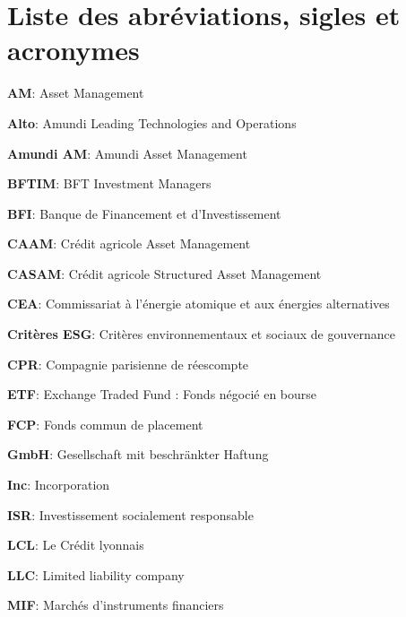 \chapter*{Liste des abréviations, sigles et acronymes}
\par \textbf{AM}: Asset Management \\
\par \textbf{Alto}: Amundi Leading Technologies and Operations \\
\par \textbf{Amundi AM}: Amundi Asset Management \\
\par \textbf{BFTIM}: BFT Investment Managers \\
\par \textbf{BFI}: Banque de Financement et d'Investissement \\
\par \textbf{CAAM}: Crédit agricole Asset Management \\
\par \textbf{CASAM}: Crédit agricole Structured Asset Management \\
\par \textbf{CEA}: Commissariat à l'énergie atomique et aux énergies alternatives\\
\par \textbf{Critères ESG}: Critères environnementaux et sociaux de gouvernance\\
\par \textbf{CPR}: Compagnie parisienne de réescompte \\
\par \textbf{ETF}: Exchange Traded Fund : Fonds négocié en bourse\\
\par \textbf{FCP}: Fonds commun de placement \\
\par \textbf{GmbH}: Gesellschaft mit beschränkter Haftung \\
\par \textbf{Inc}: Incorporation \\
\par \textbf{ISR}: Investissement socialement responsable \\
\par \textbf{LCL}: Le Crédit lyonnais \\
\par \textbf{LLC}: Limited liability company \\
\par \textbf{MIF}: Marchés d'instruments financiers \\
